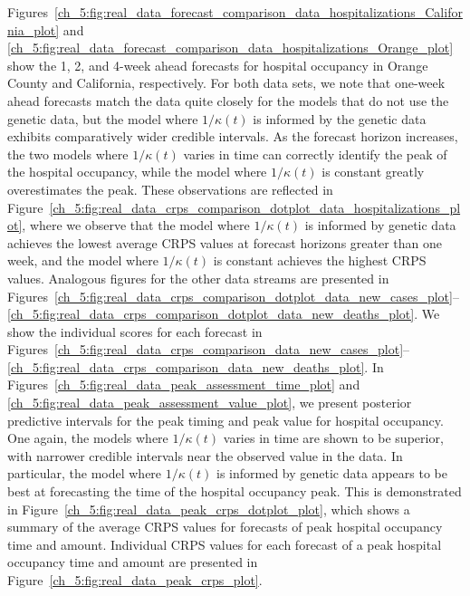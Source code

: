 Figures~\ref{ch_5:fig:real_data_forecast_comparison_data_hospitalizations_California_plot} and \ref{ch_5:fig:real_data_forecast_comparison_data_hospitalizations_Orange_plot} show the 1, 2, and 4-week ahead forecasts for hospital occupancy in Orange County and California, respectively.
For both data sets, we note that one-week ahead forecasts match the data quite closely for the models that do not use the genetic data, but the model where \( 1 / \kappa(t) \) is informed by the genetic data exhibits comparatively wider credible intervals.
As the forecast horizon increases, the two models where \( 1 / \kappa(t) \) varies in time can correctly identify the peak of the hospital occupancy, while the model where \( 1 / \kappa(t) \) is constant greatly overestimates the peak.
These observations are reflected in Figure~\ref{ch_5:fig:real_data_crps_comparison_dotplot_data_hospitalizations_plot}, where we observe that the model where \( 1 / \kappa(t) \) is informed by genetic data achieves the lowest average CRPS values at forecast horizons greater than one week, and the model where \( 1 / \kappa(t) \) is constant achieves the highest CRPS values.
Analogous figures for the other data streams are presented in Figures~\ref{ch_5:fig:real_data_crps_comparison_dotplot_data_new_cases_plot}--\ref{ch_5:fig:real_data_crps_comparison_dotplot_data_new_deaths_plot}.
We show the individual scores for each forecast in Figures~\ref{ch_5:fig:real_data_crps_comparison_data_new_cases_plot}--\ref{ch_5:fig:real_data_crps_comparison_data_new_deaths_plot}.
In Figures~\ref{ch_5:fig:real_data_peak_assessment_time_plot} and \ref{ch_5:fig:real_data_peak_assessment_value_plot}, we present posterior predictive intervals for the peak timing and peak value for hospital occupancy.
One again, the models where \( 1 / \kappa(t) \) varies in time are shown to be superior, with narrower credible intervals near the observed value in the data.
In particular, the model where \( 1 / \kappa(t) \) is informed by genetic data appears to be best at forecasting the time of the hospital occupancy peak.
This is demonstrated in Figure~\ref{ch_5:fig:real_data_peak_crps_dotplot_plot}, which shows a summary of the average CRPS values for forecasts of peak hospital occupancy time and amount.
Individual CRPS values for each forecast of a peak hospital occupancy time and amount are presented in Figure~\ref{ch_5:fig:real_data_peak_crps_plot}.


